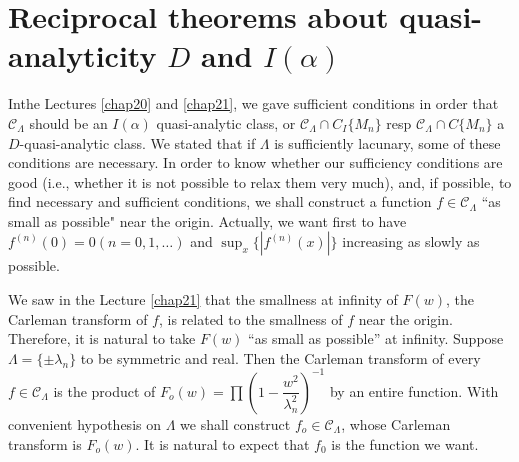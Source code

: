 \chapter{Reciprocal theorems about quasi-analyticity \texorpdfstring{$D$}{D}
 and \texorpdfstring{$I(\alpha)$}{Ialpha}}\label{chap22}%


In\pageoriginale the Lectures \ref{chap20} and \ref{chap21}, we gave
sufficient conditions in order 
that $\mathscr{C}_\Lambda$ should be an $I(\alpha)$ quasi-analytic
class, or $\mathscr{C}_\Lambda \cap C_I \{M_n \}$ resp
$\mathscr{C}_\Lambda \cap C \{M_n \}$ a $D$-quasi-analytic class. We
stated that if $\Lambda$ is sufficiently lacunary, some of these
conditions are necessary. In order to know whether our sufficiency
conditions are good (i.e., whether it is not possible to relax them
very much), and, if possible, to find necessary and sufficient
conditions, we shall construct a function $f \in \mathscr{C}_\Lambda$
``as small as possible" near the origin. Actually, we want first to
have $f^{(n)}(0) = 0 (n=0,1,\ldots)$ and $\sup_x \{|f^{(n)} (x) | \}$
increasing as slowly as possible. 

We saw in the Lecture \ref{chap21} that the smallness at infinity of $F(w)$,
the Carleman transform of $f$, is related to the smallness of $f$ near
the origin. Therefore, it is natural to take $F(w)$ ``as small as
possible'' at infinity. Suppose $\Lambda = \{\pm \lambda_n \}$ to be
symmetric and real. Then the Carleman transform of every $f \in
\mathscr{C}_\Lambda $ is the product of $F_o (w) = \prod (1 -
\dfrac{w^2}{\lambda^2_n})^{-1}$ by an entire function. With convenient
hypothesis on $\Lambda$ we shall construct $f_o \in
\mathscr{C}_\Lambda$, whose Carleman transform is $F_o(w)$. It is
natural to expect that $f_0$ is the function we want. 

